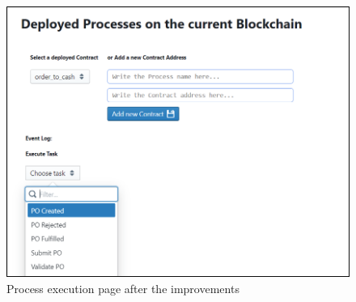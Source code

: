 \begin{figure}[htb]
	\includegraphics[width=\textwidth]{gfx/persistence_after}
	\caption{Process execution page after the improvements}
	\label{fig:impr:persistence:after}
\end{figure}


